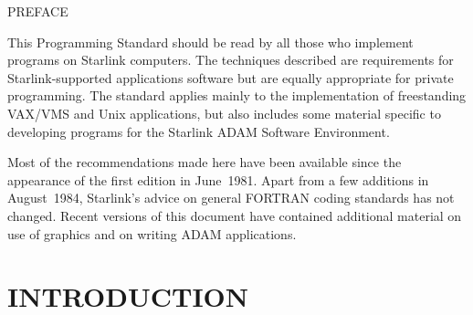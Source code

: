 \documentclass[twoside,11pt]{article}
\newcommand{\stardocinitials}  {SGP}
\newcommand{\stardocnumber}    {16.10}
\newcommand{\stardocname}{\stardocinitials /\stardocnumber}
\newenvironment{latexonly}{}{}
\newcommand{\html}[1]{}
\newcommand{\xlabel}[1]{}
\newcommand{\latexonlytoc}[0]{\tableofcontents}
\renewcommand{\_}{{\tt\char'137}}
\begin{document}
\newpage

\begin{latexonly}\begin{center}
\vspace{10mm}
PREFACE
\end{center}
\end{latexonly}
\html{\section{\xlabel{preface}PREFACE}}

This Programming Standard should be read by all those who implement
programs on Starlink computers.  The techniques described are
requirements for Starlink-supported applications software but are equally
appropriate for private programming.  The standard applies mainly
to the implementation of freestanding VAX/VMS and Unix
applications, but also includes some material specific to developing
programs for the Starlink ADAM Software Environment.

Most of the recommendations made here have been available since
the appearance of the first edition in June~1981.
Apart from a few additions in August~1984, Starlink's advice
on general FORTRAN coding standards has not changed.
Recent versions of this document
have contained additional material on use
of graphics and on writing ADAM applications.

\newpage
\section{INTRODUCTION}
\end{document}
